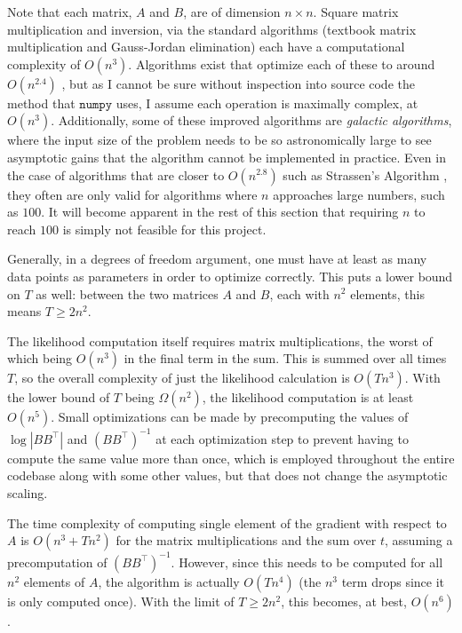 \documentclass[12pt]{article}
\theoremstyle{definition}
\begin{document}
Note that each matrix, $A$ and $B$, are of dimension $n \times n$. Square matrix multiplication and  inversion, via the standard algorithms (textbook matrix multiplication and Gauss-Jordan elimination) each have a computational complexity of $O(n^3)$. Algorithms exist that optimize each of these to around $O(n^{2.4})$ \cite{FastMatrixMultiplicationGalatic}, but as I cannot be sure without inspection into source code the method that $\texttt{numpy}$ uses, I assume each operation is maximally complex, at $O(n^3)$. Additionally, some of these improved algorithms are \textit{galactic algorithms}, where the input size of the problem needs to be so astronomically large to see asymptotic gains that the algorithm cannot be implemented in practice. Even in the case of algorithms that are closer to $O(n^{2.8})$ such as Strassen's Algorithm \cite{StrassenFastMatrixMultiplication}, they often are only valid for algorithms where $n$ approaches large numbers, such as $100$. It will become apparent in the rest of this section that requiring $n$ to reach $100$ is simply not feasible for this project.

Generally, in a degrees of freedom argument, one must have at least as many data points as parameters in order to optimize correctly. This puts a lower bound on $T$ as well: between the two matrices $A$ and $B$, each with $n^2$ elements, this means $T \geq 2n^2$.

The likelihood computation itself requires matrix multiplications, the worst of which being $O(n^3)$ in the final term in the sum. This is summed over all times $T$, so the overall complexity of just the likelihood calculation is $O(Tn^3)$. With the lower bound of $T$ being $\Omega(n^2)$, the likelihood computation is at least $O(n^5)$. Small optimizations can be made by precomputing the values of $\log|BB^\top|$ and $(BB^\top)^{-1}$ at each optimization step to prevent having to compute the same value more than once, which is employed throughout the entire codebase along with some other values, but that does not change the asymptotic scaling. 

The time complexity of computing single element of the gradient with respect to $A$ is $O(n^3 + Tn^2)$ for the matrix multiplications and the sum over $t$, assuming a precomputation of $(BB^\top)^{-1}$. However, since this needs to be computed for all $n^2$ elements of $A$, the algorithm is actually $O(Tn^4)$ (the $n^3$ term drops since it is only computed once). With the limit of $T \geq 2n^2$, this becomes, at best, $O(n^6)$.
\end{document}
